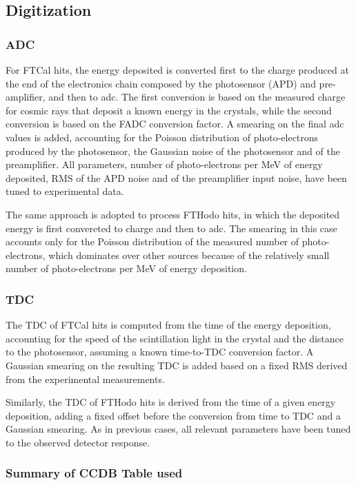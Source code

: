 \subsection{Digitization}

\subsubsection{ADC}
For FTCal hits, the energy deposited is converted first to the charge produced at the end of the electronics chain composed by the photosensor (APD) and pre-amplifier, and then to adc. The first conversion is based on the measured charge for cosmic rays that deposit a known energy in the crystals, while the second conversion is based on the FADC conversion factor. A smearing on the final adc values is added, accounting for the Poisson distribution of photo-electrons produced by the photosensor, the Gaussian noise of the photosensor and of the preamplifier. All parameters, number of photo-electrons per MeV of energy deposited, RMS of the APD noise and of the preamplifier input noise, have been tuned to experimental data.

The same approach is adopted to process FTHodo hits, in which the deposited energy is first convereted to charge and then to adc. The smearing in this case accounts only for the Poisson distribution of the measured number of photo-electrons, which dominates over other sources because of the relatively small number of photo-electrons per MeV of energy deposition.

\subsubsection{TDC}
The TDC of FTCal hits is computed from the time of the energy deposition, accounting for the speed of the scintillation light in the crystal and the distance to the photosensor, assuming a known time-to-TDC conversion factor. A Gaussian smearing on the resulting TDC is added based on a fixed RMS derived from the experimental measurements.

Similarly, the TDC of FTHodo hits is derived from the time of a given energy deposition, adding a fixed offset before the conversion from time to TDC and a Gaussian smearing. As in previous cases, all relevant parameters have been tuned to the observed detector response.

\subsubsection{Summary of CCDB Table used}
